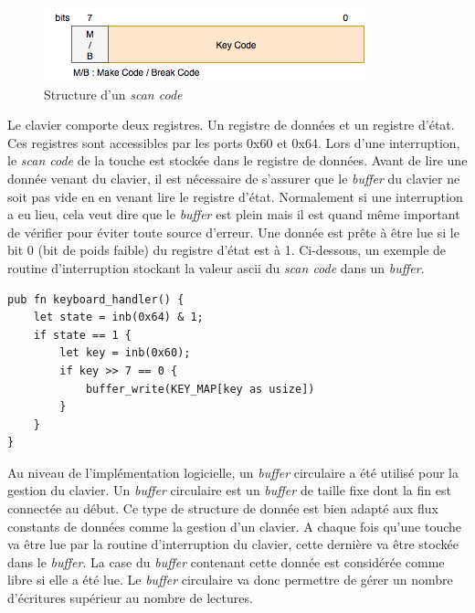 \begin{figure}[!h]
  \centering
  \includegraphics[scale=0.8]{images/scancode.png}
  \caption{Structure d'un \textit{scan code}}
  \label{scancode}
\end{figure}

Le clavier comporte deux registres. Un registre de données et un registre d'état.
Ces registres sont accessibles par les ports 0x60 et 0x64. Lors d'une interruption,
le \textit{scan code} de la touche est stockée dans le registre de données. Avant
de lire une donnée venant du clavier, il est nécessaire de s'assurer que le
\textit{buffer} du clavier ne soit pas vide en en venant lire le registre d'état.
Normalement si une interruption a eu lieu, cela veut dire que le \textit{buffer}
est plein mais il est quand même important de vérifier pour éviter toute source
d'erreur. Une donnée est prête à être lue si le bit 0 (bit de poids faible) du
registre d'état est à 1. Ci-dessous, un exemple de routine d'interruption stockant
la valeur ascii du \textit{scan code} dans un \textit{buffer}.\\

\begin{code}
\begin{verbatim}
pub fn keyboard_handler() {
    let state = inb(0x64) & 1;
    if state == 1 {
        let key = inb(0x60);
        if key >> 7 == 0 {
            buffer_write(KEY_MAP[key as usize])
        }
    }
}
\end{verbatim}
\caption{Routine d'interruption du clavier}
\label{lst:keyboard:handler}
\end{code} \bigbreak

Au niveau de l'implémentation logicielle, un \textit{buffer} circulaire a été
utilisé pour la gestion du clavier. Un \textit{buffer} circulaire est un \textit{buffer}
de taille fixe dont la fin est connectée au début. Ce type de structure de donnée
est bien adapté aux flux constants de données comme la gestion d'un clavier.
A chaque fois qu'une touche va être lue par la routine d'interruption du clavier,
cette dernière va être stockée dans le \textit{buffer}. La case du \textit{buffer}
contenant cette donnée est considérée comme libre si elle a été lue. Le \textit{buffer}
circulaire va donc permettre de gérer un nombre d'écritures supérieur au nombre
de lectures.
